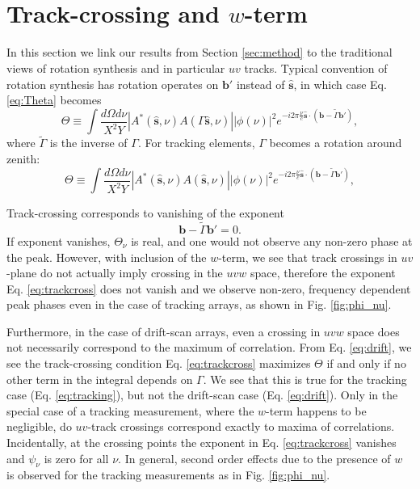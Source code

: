 \documentclass[twocolumn,apj,numberedappendix]{emulateapj}
\renewcommand\[{\begin{equation}}
\renewcommand\]{\end{equation}}
\begin{document}
\pagebreak



\appendix
\section{\\Track-crossing and $w$-term \label{sec:appA}}
\label{sec:appA}
In this section we link our results from Section \ref{sec:method} to the traditional views of rotation synthesis and in particular $uv$ tracks. 
Typical convention of rotation synthesis has rotation operates on $\boldsymbol{b'}$ instead of $\hat{\boldsymbol{s}}$, in which case Eq. \eqref{eq:Theta} becomes
\begin{equation}
\Theta \equiv\int\frac{d\Omega d\nu}{X^{2}Y}|A^{*}(\hat{\boldsymbol{s}},\nu)A(\Gamma\hat{\boldsymbol{s}},\nu)||\phi(\nu)|^{2} e^{-i2\pi\frac{\nu}{c}\hat{\boldsymbol{s}}\cdot\left(\boldsymbol{b}-\widetilde{\Gamma}\boldsymbol{b'}\right)}, 
\label{eq:drift}
\end{equation}
where $\widetilde{\Gamma}$ is the inverse of $\Gamma$. 
For tracking elements, $\Gamma$ becomes a rotation around zenith:
\begin{equation}
\Theta \equiv\int\frac{d\Omega d\nu}{X^{2}Y}|A^{*}(\hat{\boldsymbol{s}},\nu)A(\hat{\boldsymbol{s}},\nu)||\phi(\nu)|^{2} e^{-i2\pi\frac{\nu}{c}\hat{\boldsymbol{s}}\cdot\left(\boldsymbol{b}-\widetilde{\Gamma}\boldsymbol{b'}\right)}, 
\label{eq:tracking}
\end{equation}

Track-crossing corresponds to vanishing of the exponent
\[
 \boldsymbol{b}-\widetilde{\Gamma}\boldsymbol{b'} = 0. \label{eq:trackcross}
 \]
If exponent vanishes, $\Theta_{\nu}$ is real, and one would not observe any non-zero phase at the peak. However, with inclusion of the $w$-term, we see that track crossings in $uv$-plane do not actually imply crossing in the $uvw$ space, therefore the exponent Eq. \eqref{eq:trackcross} does not vanish and we observe non-zero, frequency dependent peak phases even in the case of tracking arrays, as shown in Fig. \ref{fig:phi_nu}. 

Furthermore, in the case of drift-scan arrays, even a crossing in $uvw$ space does not necessarily correspond to the maximum of correlation. From Eq. \eqref{eq:drift}, we see the track-crossing condition Eq. \eqref{eq:trackcross} maximizes $\Theta$ if and only if no other term in the integral depends on $\Gamma$. We see that this is true for the tracking case (Eq. \eqref{eq:tracking}), but not the drift-scan case (Eq. \eqref{eq:drift}). Only in the special case of a tracking measurement, where the $w$-term happens to be negligible, do $uv$-track crossings correspond exactly to maxima of correlations. Incidentally, at the crossing points the exponent in Eq. \eqref{eq:trackcross} vanishes and $\psi_\nu$ is zero for all $\nu$. In general, second order effects due to the presence of $w$ is observed for the tracking measurements as in Fig. \ref{fig:phi_nu}. 
\end{document}
